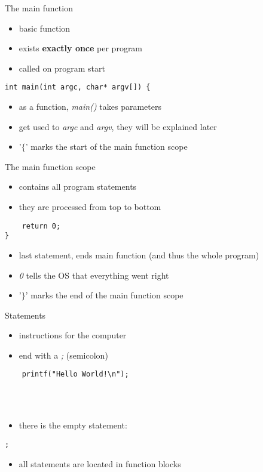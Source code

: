 \begin{frame}[fragile]{The main function}
	\begin{itemize}
		\item basic function
		\item exists \textbf{exactly once} per program
		\item called on program start
	\end{itemize}
	\begin{lstlisting}
int main(int argc, char* argv[]) {
\end{lstlisting}
	\begin{itemize}
		\item as a function, \textit{main()} takes parameters
		\item get used to \textit{argc} and \textit{argv}, they will be explained later
		\item '$\lbrace$' marks the start of the main function scope
	\end{itemize}
\end{frame}
\begin{frame}[fragile]{The main function scope}
	\begin{itemize}
		\item contains all program statements
		\item they are processed from top to bottom
	\end{itemize}
	\begin{lstlisting}
	return 0;
}
\end{lstlisting}
	\begin{itemize}
		\item last statement, ends main function (and thus the whole program)
		\item \textit{0} tells the OS that everything went right
		\item '$\rbrace$' marks the end of the main function scope
	\end{itemize}
\end{frame}
\begin{frame}[fragile]{Statements}
	\begin{itemize}
		\item instructions for the computer
		\item end with a \textit{;} (semicolon)
	\end{itemize}
	\begin{lstlisting}
	printf("Hello World!\n");
\end{lstlisting} \ \\ \ \\
	\begin{itemize}
		\item there is the empty statement:
	\end{itemize}
	\begin{lstlisting}[numbers=none]
	;
\end{lstlisting}
	\begin{itemize}
		\item all statements are located in function blocks
	\end{itemize}
\end{frame}

